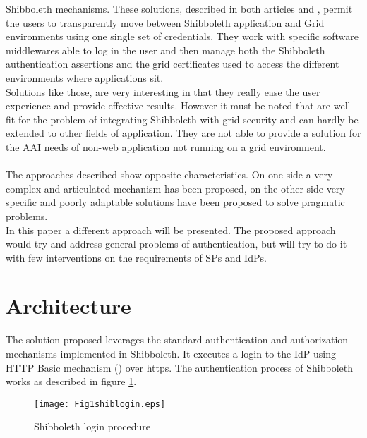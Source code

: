 Shibboleth mechanisms.
These solutions, described in both articles \cite{Wang-2009} and \cite{Jensen-2007}, permit the users to transparently move between Shibboleth
application and Grid environments using one single set of credentials.
They work with specific software middlewares able to log in the user and then manage both the Shibboleth authentication assertions and the
grid certificates used to access the different environments where applications sit.\\
Solutions like those, are very interesting in that they really ease the user experience and provide effective results.
However it must be noted that are well fit for the problem of integrating Shibboleth with grid security and can hardly be extended to other
fields of application.
They are not able to provide a solution for the AAI needs of non-web application not running on a grid environment.\\
\\
The approaches described show opposite characteristics.
On one side a very complex and articulated mechanism has been proposed, on the other side very specific and poorly adaptable solutions
have been proposed to solve pragmatic problems.\\
In this paper a different approach will be presented.
The proposed approach would try and address general problems of authentication, but will try to do it with few interventions on the
requirements of SPs and IdPs.

\label{sec:architecture}
\section{Architecture}
The solution proposed leverages the standard authentication and authorization mechanisms implemented in Shibboleth.
It executes a login to the IdP using HTTP Basic mechanism (\cite{Franks-1999}) over https.
The authentication process of Shibboleth works as described in figure \ref{fig:shiblogin}.

\begin{figure}[h]
\centering
\texttt{[image: Fig1shiblogin.eps]}
\caption{Shibboleth login procedure}
\label{fig:shiblogin}
\end{figure}


